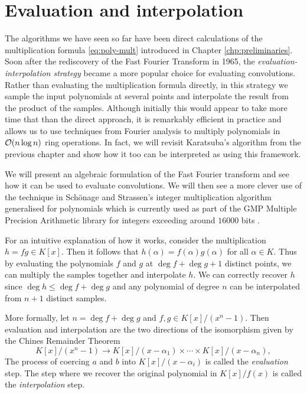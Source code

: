 \chapter{Evaluation and interpolation}\label{chp:eval-interp}

The algorithms we have seen so far have been direct calculations of the multiplication formula \eqref{eq:poly-mult} introduced in Chapter \ref{chp:preliminaries}. Soon after the rediscovery of the Fast Fourier Transform in 1965, the \textit{evaluation-interpolation strategy} became a more popular choice for evaluating convolutions. Rather than evaluating the multiplication formula directly, in this strategy we sample the input polynomials at several points and interpolate the result from the product of the samples. Although initially this would appear to take more time that than the direct approach, it is remarkably efficient in practice and allows us to use techniques from Fourier analysis to multiply polynomials in $\mathcal O(n \log n)$ ring operations. In fact, we will revisit Karatsuba's algorithm from the previous chapter and show how it too can be interpreted as using this framework.

We will present an algebraic formulation of the Fast Fourier transform and see how it can be used to evaluate convolutions. We will then see a more clever use of the technique in Sch\"{o}nage and Strassen's integer multiplication algorithm generalised for polynomials which is currently used as part of the GMP Multiple Precision Arithmetic library for integers exceeding around $16000$ bits \cite{gmp-big-num}.

For an intuitive explanation of how it works, consider the multiplication $h = fg \in K[x]$. Then it follows that $h(\alpha) = f(\alpha)g(\alpha)$ for all $\alpha \in K$. Thus by evaluating the polynomials $f$ and $g$ at $\deg f + \deg g + 1$ distinct points, we can multiply the samples together and interpolate $h$. We can correctly recover $h$ since $\deg h \le \deg f + \deg g$ and any polynomial of degree $n$ can be interpolated from $n + 1$ distinct samples.

More formally, let $n = \deg f + \deg g$ and $f, g \in K[x]/(x^n - 1)$. Then evaluation and interpolation are the two directions of the isomorphism given by the Chines Remainder Theorem
\[
    K[x]/(x^n - 1) \to K[x]/(x - \alpha_1) \times \cdots \times K[x]/(x - \alpha_n),
\]
The process of coercing $a$ and $b$ into $K[x]/ (x - \alpha_i)$ is called the \emph{evaluation} step. The step where we recover the original polynomial in $K[x]/f(x)$ is called the \emph{interpolation} step.

